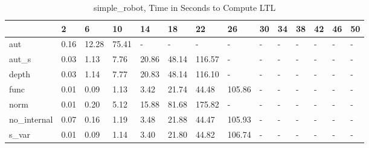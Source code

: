 \begin{table}
\caption{simple_robot, Time in Seconds to Compute LTL}
\label{simple_robot_LTL_time}
\begin{tabular}{llllllllllllll}
\toprule
 & 2 & 6 & 10 & 14 & 18 & 22 & 26 & 30 & 34 & 38 & 42 & 46 & 50 \\
\midrule
aut & 0.16 & 12.28 & 75.41 & - & - & - & - & - & - & - & - & - & - \\
aut_s & 0.03 & 1.13 & 7.76 & 20.86 & 48.14 & 116.57 & - & - & - & - & - & - & - \\
depth & 0.03 & 1.14 & 7.77 & 20.83 & 48.14 & 116.10 & - & - & - & - & - & - & - \\
func & 0.01 & 0.09 & 1.13 & 3.42 & 21.74 & 44.48 & 105.86 & - & - & - & - & - & - \\
norm & 0.01 & 0.20 & 5.12 & 15.88 & 81.68 & 175.82 & - & - & - & - & - & - & - \\
no_internal & 0.07 & 0.16 & 1.19 & 3.48 & 21.88 & 44.47 & 105.93 & - & - & - & - & - & - \\
s_var & 0.01 & 0.09 & 1.14 & 3.40 & 21.80 & 44.82 & 106.74 & - & - & - & - & - & - \\
\bottomrule
\end{tabular}
\end{table}

